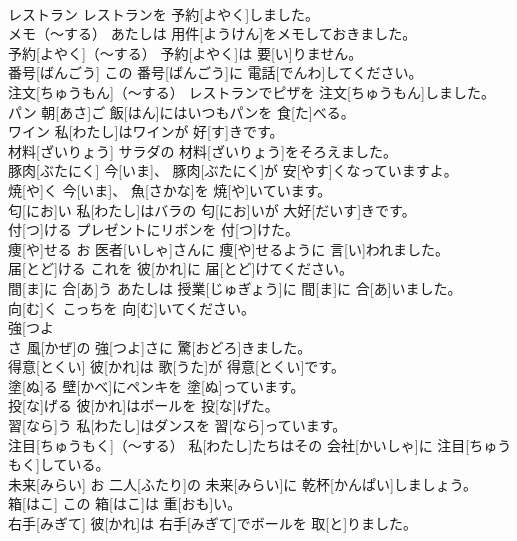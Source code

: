 \documentclass[8pt]{extreport}
\begin{document}
\begin{CJK}{UTF8}{min}
\\	レストラン	レストランを 予約[よやく]しました。		
\\	メモ（～する）	あたしは 用件[ようけん]をメモしておきました。		
\\	予約[よやく]（～する）	予約[よやく]は 要[い]りません。		
\\	番号[ばんごう]	この 番号[ばんごう]に 電話[でんわ]してください。		
\\	注文[ちゅうもん]（～する）	レストランでピザを 注文[ちゅうもん]しました。		
\\	パン	朝[あさ]ご 飯[はん]にはいつもパンを 食[た]べる。		
\\	ワイン	私[わたし]はワインが 好[す]きです。		
\\	材料[ざいりょう]	サラダの 材料[ざいりょう]をそろえました。		
\\	豚肉[ぶたにく]	今[いま]、 豚肉[ぶたにく]が 安[やす]くなっていますよ。		
\\	焼[や]く	今[いま]、 魚[さかな]を 焼[や]いています。		
\\	匂[にお]い	私[わたし]はバラの 匂[にお]いが 大好[だいす]きです。		
\\	付[つ]ける	プレゼントにリボンを 付[つ]けた。		
\\	痩[や]せる	お 医者[いしゃ]さんに 痩[や]せるように 言[い]われました。		
\\	届[とど]ける	これを 彼[かれ]に 届[とど]けてください。		
\\	間[ま]に 合[あ]う	あたしは 授業[じゅぎょう]に 間[ま]に 合[あ]いました。		
\\	向[む]く	こっちを 向[む]いてください。		
\\	強[つよ
\\	さ	風[かぜ]の 強[つよ]さに 驚[おどろ]きました。		
\\	得意[とくい]	彼[かれ]は 歌[うた]が 得意[とくい]です。		
\\	塗[ぬ]る	壁[かべ]にペンキを 塗[ぬ]っています。		
\\	投[な]げる	彼[かれ]はボールを 投[な]げた。		
\\	習[なら]う	私[わたし]はダンスを 習[なら]っています。		
\\	注目[ちゅうもく]（～する）	私[わたし]たちはその 会社[かいしゃ]に 注目[ちゅうもく]している。		
\\	未来[みらい]	お 二人[ふたり]の 未来[みらい]に 乾杯[かんぱい]しましょう。		
\\	箱[はこ]	この 箱[はこ]は 重[おも]い。		
\\	右手[みぎて]	彼[かれ]は 右手[みぎて]でボールを 取[と]りました。		

\end{CJK}
\end{document}
